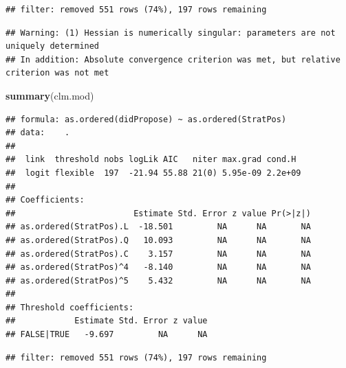 \documentclass[
]{article}
\newenvironment{Shaded}{\begin{snugshade}}{\end{snugshade}}
\newcommand{\CommentTok}[1]{\textcolor[rgb]{0.56,0.35,0.01}{\textit{#1}}}
\newcommand{\DecValTok}[1]{\textcolor[rgb]{0.00,0.00,0.81}{#1}}
\newcommand{\KeywordTok}[1]{\textcolor[rgb]{0.13,0.29,0.53}{\textbf{#1}}}
\newcommand{\NormalTok}[1]{#1}
\newcommand{\OperatorTok}[1]{\textcolor[rgb]{0.81,0.36,0.00}{\textbf{#1}}}
\newcommand{\StringTok}[1]{\textcolor[rgb]{0.31,0.60,0.02}{#1}}
\begin{document}
\begin{verbatim}
## filter: removed 551 rows (74%), 197 rows remaining
\end{verbatim}

\begin{verbatim}
## Warning: (1) Hessian is numerically singular: parameters are not uniquely determined 
## In addition: Absolute convergence criterion was met, but relative criterion was not met
\end{verbatim}

\begin{Shaded}
\begin{Highlighting}[]
\KeywordTok{summary}\NormalTok{(clm.mod)}
\end{Highlighting}
\end{Shaded}

\begin{verbatim}
## formula: as.ordered(didPropose) ~ as.ordered(StratPos)
## data:    .
## 
##  link  threshold nobs logLik AIC   niter max.grad cond.H 
##  logit flexible  197  -21.94 55.88 21(0) 5.95e-09 2.2e+09
## 
## Coefficients:
##                        Estimate Std. Error z value Pr(>|z|)
## as.ordered(StratPos).L  -18.501         NA      NA       NA
## as.ordered(StratPos).Q   10.093         NA      NA       NA
## as.ordered(StratPos).C    3.157         NA      NA       NA
## as.ordered(StratPos)^4   -8.140         NA      NA       NA
## as.ordered(StratPos)^5    5.432         NA      NA       NA
## 
## Threshold coefficients:
##            Estimate Std. Error z value
## FALSE|TRUE   -9.697         NA      NA
\end{verbatim}

\begin{Shaded}
\end{Shaded}

\begin{verbatim}
## filter: removed 551 rows (74%), 197 rows remaining
\end{verbatim}
\end{document}

